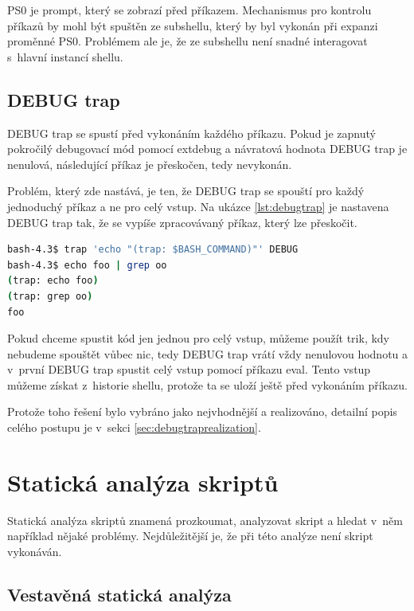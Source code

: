 \documentclass[thesis=M,czech]{FITthesis}[2012/06/26]
\begin{document}
PS0 je prompt, který se zobrazí před  příkazem. Mechanismus pro kontrolu příkazů by mohl být spuštěn ze subshellu, který by byl vykonán při expanzi proměnné PS0. Problémem ale je, že ze subshellu není snadné interagovat s~hlavní instancí shellu.

%
%
\subsection{DEBUG trap}

DEBUG trap se spustí před vykonáním každého příkazu. Pokud je zapnutý pokročilý debugovací mód pomocí extdebug a návratová hodnota DEBUG trap je nenulová, následující příkaz je přeskočen, tedy nevykonán.

Problém, který zde nastává, je ten, že DEBUG trap se spouští pro každý jednoduchý příkaz a ne pro celý vstup. Na ukázce \ref{lst:debugtrap} je nastavena DEBUG trap tak, že se vypíše zpracovávaný příkaz, který lze přeskočit.

\begin{lstlisting}[language=bash, caption={DEBUG trap}, label={lst:debugtrap}]
bash-4.3$ trap 'echo "(trap: $BASH_COMMAND)"' DEBUG
bash-4.3$ echo foo | grep oo
(trap: echo foo)
(trap: grep oo)
foo
\end{lstlisting}

Pokud chceme spustit kód jen jednou pro celý vstup, můžeme použít trik, kdy nebudeme spouštět vůbec nic, tedy DEBUG trap vrátí vždy nenulovou hodnotu a v~první DEBUG trap spustit celý vstup pomocí příkazu eval. Tento vstup můžeme získat z~historie shellu, protože ta se uloží ještě před vykonáním příkazu.

Protože toho řešení bylo vybráno jako nejvhodnější a realizováno, detailní popis celého postupu je v~sekci \ref{sec:debugtraprealization}.




\section{Statická analýza skriptů}

Statická analýza skriptů znamená prozkoumat, analyzovat skript a hledat v~něm například nějaké problémy. Nejdůležitější je, že při této analýze není skript vykonáván.


%
%
\subsection{Vestavěná statická analýza}
\end{document}
